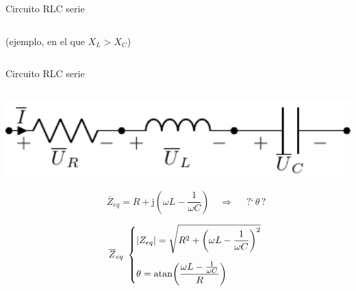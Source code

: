\documentclass[aspectratio=169, usenames,svgnames,dvipsnames]{beamer}
\newcommand{\atan}{\mathrm{atan}}
\begin{document}
\begin{frame}{Circuito RLC serie}
\begin{columns}
\begin{column}{0.4\columnwidth}
        \hspace*{7mm}(ejemplo, en el que $X_L > X_C$)
    \end{column}
    \end{columns}
\end{frame}


\begin{frame}{Circuito RLC serie}
    \begin{columns}
    \begin{column}{0.5\columnwidth}
        \begin{center}
            \hspace*{3mm}\includegraphics[width=1\textwidth]{../figs/RLC.pdf}
        \end{center}

        \vspace{-4mm}
        \[
            \qquad \overline{Z}_{eq} =  
            R + \mathrm{j} \left( \omega L - \frac{1}{\omega C} \right)            
            \quad \Rightarrow \quad \boxed{ \; \text{?`}\, \theta \,\text{?} \;}
        \]

        \vspace{-4mm}
        \[
            \quad\;\; \overline{Z}_{eq} \;
            \begin{dcases}
                |Z_{eq}| = \sqrt{R^2 + \left( \omega L - \frac{1}{\omega C} \right)^2}\\[5pt]
                \theta = \atan{ \left( \frac{\omega L - \frac{1}{\omega C}}{R} \right)}
            \end{dcases}
        \]
    \end{column}
    

\end{columns}
\end{frame}
\end{document}
